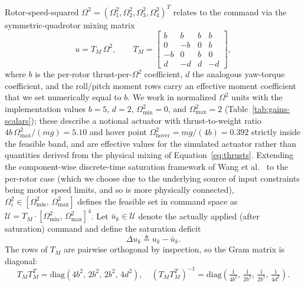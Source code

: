 \documentclass[conf]{new-aiaa}
\begin{document}
Rotor-speed-squared $\Omega^2 = (\Omega_1^2, \Omega_2^2, \Omega_3^2, \Omega_4^2)^T$ relates to the command via the symmetric-quadrotor mixing matrix
\small
\begin{equation}
\label{eq:sat-mixing}
u = T_M\, \Omega^2, \qquad
T_M = \begin{bmatrix}
b & b & b & b \\
0 & -b & 0 & b \\
-b & 0 & b & 0 \\
d & -d & d & -d
\end{bmatrix},
\end{equation}
\normalsize
where $b$ is the per-rotor thrust-per-$\Omega^2$ coefficient, $d$ the analogous yaw-torque coefficient, and the roll/pitch moment rows carry an effective moment coefficient that we set numerically equal to $b$. We work in normalized $\Omega^2$ units with the implementation values $b = 5$, $d = 2$, $\Omega^2_{\min} = 0$, and $\Omega^2_{\max} = 2$ (Table~\ref{tab:gains-scalars}); these describe a notional actuator with thrust-to-weight ratio $4b\,\Omega^2_{\max}/(mg) = 5.10$ and hover point $\Omega^2_{\mathrm{hover}} = mg/(4b) = 0.392$ strictly inside the feasible band, and are effective values for the simulated actuator rather than quantities derived from the physical mixing of Equation~\ref{eq:thrusts}. Extending the component-wise discrete-time saturation framework of Wang et al.\ \cite{refs:Wang2005} to the per-rotor case (which we choose due to the underlying source of input constraints being motor speed limits, and so is more physically connected), $\Omega_i^2 \in [\Omega^2_{\min},\, \Omega^2_{\max}]$ defines the feasible set in command space as $\mathcal{U} = T_M \cdot [\Omega^2_{\min},\, \Omega^2_{\max}]^4$. Let $\bar u_k \in \mathcal{U}$ denote the actually applied (after saturation) command and define the saturation deficit
\begin{equation}
\label{eq:sat-deficit}
\Delta u_k \triangleq u_k - \bar u_k.
\end{equation}
The rows of $T_M$ are pairwise orthogonal by inspection, so the Gram matrix is diagonal:
\small
\begin{equation}
\label{eq:sat-BBT}
T_M T_M^T = \mathrm{diag}\!\left(4 b^2,\, 2 b^2,\, 2 b^2,\, 4 d^2\right),
\quad
(T_M T_M^T)^{-1} = \mathrm{diag}\!\left(\tfrac{1}{4 b^2},\, \tfrac{1}{2 b^2},\, \tfrac{1}{2 b^2},\, \tfrac{1}{4 d^2}\right).
\end{equation}
\normalsize
\end{document}
